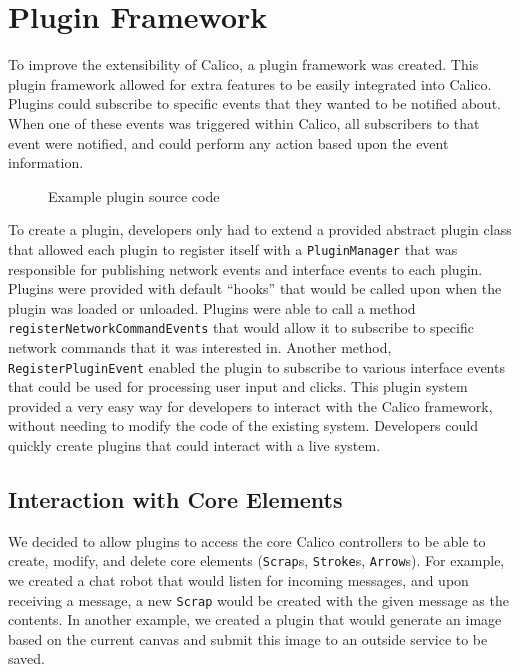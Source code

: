 \section{Plugin Framework}
To improve the extensibility of Calico, a plugin framework was created. This plugin framework allowed for extra features to be easily integrated into Calico. Plugins could subscribe to specific events that they wanted to be notified about. When one of these events was triggered within Calico, all subscribers to that event were notified, and could perform any action based upon the event information. 

\begin{figure}[h!]
  \centering
  \small
  
  \normalsize
  \caption{Example plugin source code}
  \label{code:plugin_file}
\end{figure}

To create a plugin, developers only had to extend a provided abstract plugin class that allowed each plugin to register itself with a \texttt{PluginManager} that was responsible for publishing network events and interface events to each plugin. Plugins were provided with default ``hooks'' that would be called upon when the plugin was loaded or unloaded. Plugins were able to call a method \texttt{registerNetworkCommandEvents} that would allow it to subscribe to specific network commands that it was interested in. Another method, \texttt{RegisterPluginEvent} enabled the plugin to subscribe to various interface events that could be used for processing user input and clicks. This plugin system provided a very easy way for developers to interact with the Calico framework, without needing to modify the code of the existing system. Developers could quickly create plugins that could interact with a live system.

\subsection*{Interaction with Core Elements}
We decided to allow plugins to access the core Calico controllers to be able to create, modify, and delete core elements (\texttt{Scrap}s, \texttt{Stroke}s, \texttt{Arrow}s). For example, we created a chat robot that would listen for incoming messages, and upon receiving a message, a new \texttt{Scrap} would be created with the given message as the contents. In another example, we created a plugin that would generate an image based on the current canvas and submit this image to an outside service to be saved.

